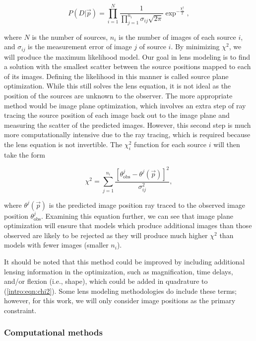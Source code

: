 \begin{equation}
P(D | \vec{p} ) = \prod_{i=1}^N \frac{1}{  \prod_{j=1}^{n_i} \sigma_{ij} \sqrt{2\pi} } \exp^{-\frac{\chi_i^2}{2}},
\label{intro:eqn:likelihood}
\end{equation}

\noindent where $N$ is the number of sources, $n_i$ is the number of images of each source $i$, and $\sigma_{ij}$ is the measurement error of image $j$ of source $i$. By minimizing $\chi^2$, we will produce the maximum likelihood model. Our goal in lens modeling is to find a solution with the smallest scatter between the source positions mapped to each of its images. Defining the likelihood in this manner is called source plane optimization. While this still solves the lens equation, it is not ideal as the position of the sources are unknown to the observer. The more appropriate method would be image plane optimization, which involves an extra step of ray tracing the source position of each image back out to the image plane and measuring the scatter of the predicted images. However, this second step is much more computationally intensive due to the ray tracing, which is required because the lens equation is not invertible. The $\chi_i^2$ function for each source $i$ will then take the form

\begin{equation}
\chi^2 = \sum_{j=1}^{n_i} \frac{[\theta_\mathrm{obs}^j - \theta^j (\vec{p})]^2}{\sigma_{ij}^2},
\label{intro:eqn:chi2}
\end{equation}

\noindent where $\theta^j (\vec{p})$ is the predicted image position ray traced to the observed image position $\theta_\mathrm{obs}^j$. Examining this equation further, we can see that image plane optimization will ensure that models which produce additional images than those observed are likely to be rejected as they will produce much higher $\chi^2$ than models with fewer images (smaller $n_i$).

It should be noted that this method could be improved by including additional lensing information in the optimization, such as magnification, time delays, and/or flexion (i.e., shape), which could be added in quadrature to (\ref{intro:eqn:chi2}). Some lens modeling methodologies do include these terms; however, for this work, we will only consider image positions as the primary constraint.

\subsubsection{Computational methods}

